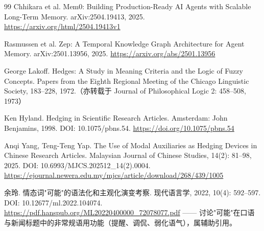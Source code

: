 \documentclass{article}
\begin{document}
\begin{thebibliography}{99}
 Chhikara et al. Mem0: Building Production-Ready AI Agents with Scalable Long-Term Memory. arXiv:2504.19413, 2025. \url{https://arxiv.org/html/2504.19413v1}

 Rasmussen et al. Zep: A Temporal Knowledge Graph Architecture for Agent Memory. arXiv:2501.13956, 2025. \url{https://arxiv.org/abs/2501.13956}

 George Lakoff. Hedges: A Study in Meaning Criteria and the Logic of Fuzzy Concepts. Papers from the Eighth Regional Meeting of the Chicago Linguistic Society, 183–228, 1972.（亦转载于 Journal of Philosophical Logic 2: 458–508, 1973）

 Ken Hyland. Hedging in Scientific Research Articles. Amsterdam: John Benjamins, 1998. DOI: 10.1075/pbns.54. \url{https://doi.org/10.1075/pbns.54}

 Anqi Yang, Teng-Teng Yap. The Use of Modal Auxiliaries as Hedging Devices in Chinese Research Articles. Malaysian Journal of Chinese Studies, 14(2): 81–98, 2025. DOI: 10.6993/MJCS.202512\_14(2).0004. \url{https://ejournal.newera.edu.my/mjcs/article/download/268/439/1005}

 余玲. 情态词"可能"的语法化和主观化演变考察. 现代语言学, 2022, 10(4): 592–597. DOI: 10.12677/ml.2022.104074. \url{https://pdf.hanspub.org/ML20220400000_72078077.pdf} —— 讨论"可能"在口语与新闻标题中的非常规语用功能（提醒、调侃、弱化语气），属辅助引用。

\end{thebibliography}
\end{document}
